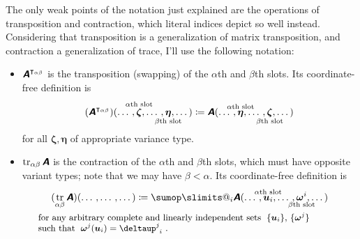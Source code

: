 \documentclass[\ifafour a4paper,12pt,\else a5paper,10pt,\fi%
onecolumn,oneside,article,%
british%
]{memoir}
\makeatletter
\theoremstyle{remark}
\theoremstyle{innote}
\def\sum{\DOTSI\sumop\slimits@}
\newcommand*{\mathte}[1]{\textbf{\textit{\textsf{#1}}}}
\newcommand*{\delt}{\deltaup}%
\DeclareMathOperator{\tr}{tr}%
\newcommand*{\defd}{\coloneqq}
\DeclarePairedDelimiter\set{\{}{\}}
\renewcommand*{\|}[1][]{\nonscript\,#1\vert\nonscript\;\mathopen{}}
\newcommand*{\tsum}{\mathop{\textstyle\sum}\nolimits}
\newcommand*{\yA}{\mathte{A}}
\renewcommand*{\i}{\indices}
\newcommand*{\id}{\mathbf{id}}%
\makeatother
\begin{document}
The only weak points of the notation just explained are the operations of
transposition and contraction, which literal indices depict so well
instead. Considering that transposition is a generalization of matrix
transposition, and contraction a generalization of trace, I'll use the
following notation:
\begin{itemize}[wide]%
\item $\yA^{\intercal_{\alpha\beta}}$ is the transposition
  (swapping) of the $\alpha$th and $\beta$th slots. Its coordinate-free
  definition is
  \begin{equation}
    \label{eq:def_transp}
    (\yA^{\intercal_{\alpha\beta}})(\dotso,
    \overset{\mathclap{\scriptstyle\text{$\alpha$th slot}}}{\bm{\zeta}}
    ,\dotso,
    \underset{\mathclap{\scriptstyle\text{$\beta$th slot}}}{\bm{\eta}}
    ,\dotso)
    \defd
    \yA(\dotso,
    \overset{\mathclap{\scriptstyle\text{$\alpha$th slot}}}{\bm{\eta}}
    ,\dotso,
    \underset{\mathclap{\scriptstyle\text{$\beta$th slot}}}{\bm{\zeta}}
    ,\dotso)
  \end{equation}
  for all $\bm{\zeta},\bm{\eta}$ of appropriate variance type.
  
\item $\tr_{\alpha\beta}\yA$ is the contraction of the $\alpha$th and
  $\beta$th slots, which must have opposite variant types; note that we may
  have $\beta < \alpha$. Its coordinate-free definition is
  \begin{equation}
    \label{eq:def_contr}
    \begin{gathered}
      (\tr_{\alpha\beta}\yA)(\dotso
        ,\dotso
        ,\dotso)
        \defd
        \sum_{i} \yA(\dotso,
        \overset{\mathclap{\scriptstyle\text{$\alpha$th slot}}}{\bm{u}_{i}}
        ,\dotso,
        \underset{\mathclap{\scriptstyle\text{$\beta$th slot}}}{\bm{\omega}^{i}}
        ,\dotso)
      \\
      \parbox{0.9\columnwidth}{\small for any arbitrary complete and
        linearly independent sets \;$\set{\bm{u}_{i}}$,
        $\set{\bm{\omega}^{j}}$\\
        such that \;$\bm{\omega}^{j}(\bm{u}_{i}) = \delt\i{^{j}_{i}}$~.}
    \end{gathered}
  \end{equation}
\end{itemize}
\end{document}

